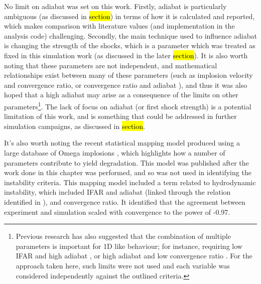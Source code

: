 No limit on adiabat was set on this work. Firstly, adiabat is particularly ambiguous (as discussed in \hl{section}) in terms of how it is calculated and reported, which makes comparison with literature values (and implementation in the analysis code) challenging. Secondly, the main technique used to influence adiabat is changing the strength of the shocks, which is a parameter which was treated as fixed in this simulation work (as discussed in the later \hl{section}). It is also worth noting that these parameters are not independent, and mathematical relationships exist between many of these parameters (such as implosion velocity and convergence ratio, or convergence ratio and adiabat \cite{Goncharov2013, Landen2021}), and thus it was also hoped that a high adiabat may arise as a consequence of the limits on other parameters\footnote{ Previous research has also suggested that the combination of multiple parameters is important for 1D like behaviour; for instance, requiring low IFAR and high adiabat \cite{Goncharov2014}, or high adiabat and low convergence ratio \cite{Goncharov2003}. For the approach taken here, such limits were not used and each variable was considered independently against the outlined criteria.}. The lack of focus on adiabat (or first shock strength) is a potential limitation of this work, and is something that could be addressed in further simulation campaigns, as discussed in \hl{section}.

It's also worth noting the recent statistical mapping model produced using a large database of Omega implosions \cite{Lees2021}, which highlights how a number of parameters contribute to yield degradation. This model was published after the work done in this chapter was performed, and so was not used in identifying the instability criteria. This mapping model included a term related to hydrodynamic instability, which included IFAR and adiabat (linked through the relation identified in \cite{Goncharov2014}), and convergence ratio. It identified that the agreement between experiment and simulation scaled with convergence to the power of -0.97.


